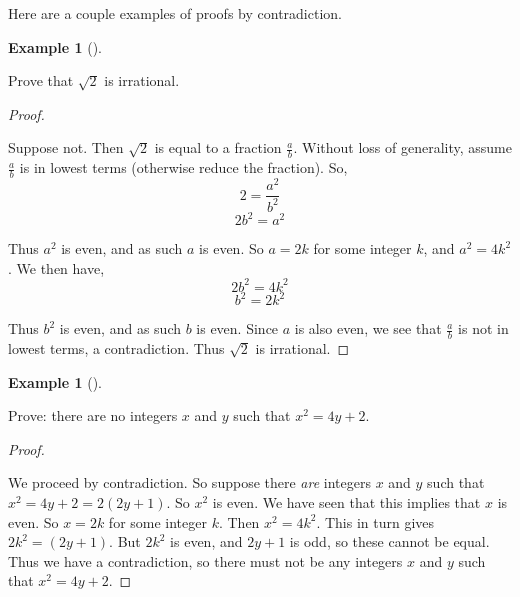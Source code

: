 \documentclass[10pt,]{book}
\theoremstyle{plain}
\theoremstyle{definition}
\newtheorem{example}[theorem]{Example}
\theoremstyle{definition}
\theoremstyle{definition}
\numberwithin{equation}{chapter}
\begin{document}
Here are a couple examples of proofs by contradiction.
%
\begin{example}[]\label{example-94}

Prove that \(\sqrt{2}\) is irrational.
%
\begin{proof}\hypertarget{proof-38}{}

Suppose not. Then \(\sqrt 2\) is equal to a fraction \(\frac{a}{b}\). Without loss of generality, assume \(\frac{a}{b}\) is in lowest terms (otherwise reduce the fraction). So,
\begin{equation*}
  2 = \frac{a^2}{b^2}
\end{equation*}
%
\begin{equation*}
  2b^2 = a^2
\end{equation*}\par

Thus \(a^2\) is even, and as such \(a\) is even. So \(a = 2k\) for some integer \(k\), and \(a^2 = 4k^2\). We then have,
\begin{equation*}
  2b^2 = 4k^2
\end{equation*}
%
\begin{equation*}
  b^2 = 2k^2
\end{equation*}\par

Thus \(b^2\) is even, and as such \(b\) is even. Since \(a\) is also even, we see that \(\frac{a}{b}\) is not in lowest terms, a contradiction. Thus \(\sqrt 2\) is irrational.
%
\end{proof}
\end{example}
\begin{example}[]\label{example-95}

Prove: there are no integers \(x\) and \(y\) such that \(x^2  = 4y + 2\).
%
\begin{proof}\hypertarget{proof-39}{}

We proceed by contradiction. So suppose there \emph{are} integers \(x\) and \(y\) such that \(x^2 = 4y + 2 = 2(2y + 1)\). So \(x^2\) is even. We have seen that this implies that \(x\) is even. So \(x = 2k\) for some integer \(k\). Then \(x^2 = 4k^2\). This in turn gives
	\(2k^2 = (2y + 1)\). But \(2k^2\) is even, and \(2y + 1\) is odd, so these cannot be equal. Thus we have a contradiction, so there must not be any integers \(x\) and \(y\) such that \(x^2 = 4y + 2\).
%
\end{proof}
\end{example}
\end{document}
